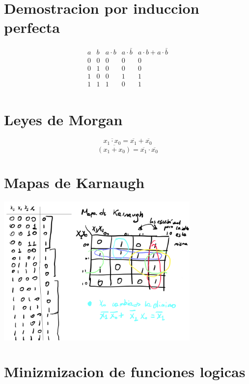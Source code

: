 \documentclass{report}
\begin{document}
\section{Demostracion por induccion perfecta}

$$
	\begin{array}{cc|c|c|c}
		a & b & a \cdot b & a \cdot \bar{b} & a \cdot b + a \cdot \bar{b} \\ \hline
		0 & 0 & 0         & 0               & 0                           \\
		0 & 1 & 0         & 0               & 0                           \\
		1 & 0 & 0         & 1               & 1                           \\
		1 & 1 & 1         & 0               & 1                           \\
	\end{array}
$$

\section{Leyes de Morgan}

$$\overline{x_1 \cdot x_0} = \overline{x_1} + \overline{x_0}$$
$$\overline{(x_1 + x_0)} = \overline{x_1} \cdot \overline{x_0}$$

\section{Mapas de Karnaugh}

\includegraphics[width=10cm]{../Assets/mapas_de_karnaugh.png}

\section{Minizmizacion de funciones logicas}
\end{document}
